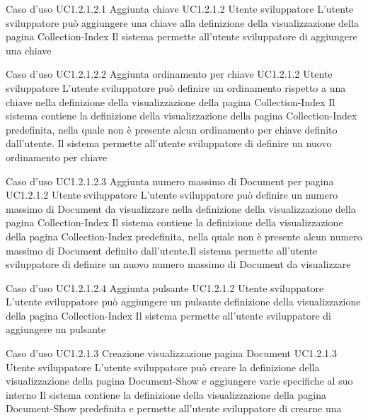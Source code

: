 \UCtitle
{Caso d'uso UC1.2.1.2.1}
{Aggiunta chiave}
\UC
{UC1.2.1.2}
{Utente sviluppatore}
{L'utente sviluppatore  può aggiungere una chiave alla definizione della visualizzazione della pagina Collection-Index}
{Il sistema permette all'utente  sviluppatore di aggiungere una chiave}


\UCtitle
{Caso d'uso UC1.2.1.2.2}
{Aggiunta ordinamento per chiave}
\UC
{UC1.2.1.2}
{Utente sviluppatore}
{L'utente sviluppatore  può  definire un ordinamento rispetto a una chiave nella definizione della visualizzazione della pagina Collection-Index}
{Il sistema contiene la definizione della visualizzazione della pagina Collection-Index predefinita, nella quale non è presente alcun ordinamento per chiave definito dall'utente. Il sistema permette all'utente  sviluppatore di definire un nuovo ordinamento per chiave}

\UCtitle
{Caso d'uso UC1.2.1.2.3}
{Aggiunta numero massimo di Document per pagina}
\UC
{UC1.2.1.2}
{Utente sviluppatore}
{L'utente sviluppatore  può definire un numero massimo di Document da visualizzare nella definizione della visualizzazione della pagina Collection-Index}
{Il sistema contiene la definizione della visualizzazione della pagina Collection-Index predefinita, nella quale non è presente alcun numero massimo di Document definito dall'utente.Il sistema permette all'utente  sviluppatore di definire un nuovo numero massimo di Document da visualizzare}

\UCtitle
{Caso d'uso UC1.2.1.2.4}
{Aggiunta pulsante}
\UC
{UC1.2.1.2}
{Utente sviluppatore}
{L'utente sviluppatore  può aggiungere un pulsante definizione della visualizzazione della pagina Collection-Index}
{Il sistema permette all'utente  sviluppatore di aggiungere un pulsante}


\UCtitle
{Caso d'uso UC1.2.1.3}
{Creazione visualizzazione pagina Document}
\UC
{UC1.2.1.3}
{Utente sviluppatore}
{L'utente sviluppatore  può creare la definizione della visualizzazione della pagina Document-Show e aggiungere varie specifiche al suo interno}
{Il sistema contiene la definizione della visualizzazione della pagina Document-Show predefinita e permette all'utente sviluppatore di crearne una}

